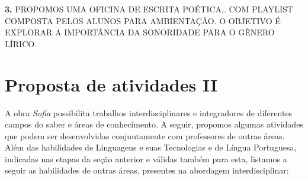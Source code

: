 \documentclass{extarticle}
\begin{document}



\textbf{3.} PROPOMOS UMA OFICINA DE ESCRITA POÉTICA,. COM PLAYLIST
COMPOSTA PELOS ALUNOS PARA AMBIENTAÇÃO. O OBJETIVO É EXPLORAR A
IMPORTÂNCIA DA SONORIDADE PARA O GÊNERO LÍRICO.

\section{Proposta de atividades II}

A obra \emph{Sofia} possibilita trabalhos interdisciplinares e
integradores de diferentes campos do saber e áreas de conhecimento. A
seguir, propomos algumas atividades que podem ser desenvolvidas
conjuntamente com professores de outras áreas. Além das habilidades de
Linguagens e suas Tecnologias e de Língua Portuguesa, indicadas nas
etapas da seção anterior e válidas também para esta, listamos a seguir
as habilidades de outras áreas, presentes na abordagem interdisciplinar:


\end{document}
